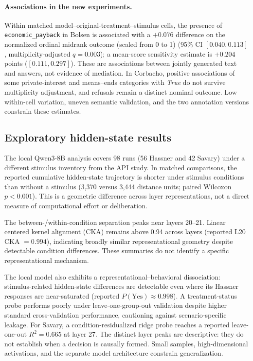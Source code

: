 \documentclass[14pt,a4paper]{extarticle}
\begin{document}
\paragraph{Associations in the new experiments.}
Within matched model--original-treatment--stimulus cells, the presence of \texttt{economic\_payback} in Bolsen is associated with a $+0.076$ difference on the normalized ordinal midrank outcome (scaled from 0 to 1) (95\% CI $[0.040,0.113]$, multiplicity-adjusted $q=0.003$); a mean-score sensitivity estimate is $+0.204$ points ($[0.111,0.297]$). These are associations between jointly generated text and answers, not evidence of mediation. In Corbacho, positive associations of some private-interest and means--ends categories with \emph{True} do not survive multiplicity adjustment, and refusals remain a distinct nominal outcome. Low within-cell variation, uneven semantic validation, and the two annotation versions constrain these estimates.

\subsection{Exploratory hidden-state results}

The local Qwen3-8B analysis covers 98 runs (56 Hassner and 42 Savary) under a different stimulus inventory from the API study. In matched comparisons, the reported cumulative hidden-state trajectory is shorter under stimulus conditions than without a stimulus (3{,}370 versus 3{,}444 distance units; paired Wilcoxon $p<0.001$). This is a geometric difference across layer representations, not a direct measure of computational effort or deliberation.

The between-/within-condition separation peaks near layers 20--21. Linear centered kernel alignment (CKA) remains above 0.94 across layers (reported L20 CKA $=0.994$), indicating broadly similar representational geometry despite detectable condition differences. These summaries do not identify a specific representational mechanism.

The local model also exhibits a representational--behavioral dissociation: stimulus-related hidden-state differences are detectable even where its Hassner responses are near-saturated (reported $P(\mathrm{Yes})\approx0.998$). A treatment-status probe performs poorly under leave-one-group-out validation despite higher standard cross-validation performance, cautioning against scenario-specific leakage. For Savary, a condition-residualized ridge probe reaches a reported leave-one-out $R^2=0.665$ at layer 27. The distinct layer peaks are descriptive: they do not establish when a decision is causally formed. Small samples, high-dimensional activations, and the separate model architecture constrain generalization.
\end{document}
